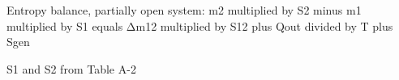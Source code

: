 Entropy balance, partially open system:  
m2 multiplied by S2 minus m1 multiplied by S1 equals Δm12 multiplied by S12 plus Qout divided by T plus Sgen  

S1 and S2 from Table A-2